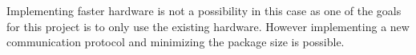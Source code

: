 Implementing faster hardware is not a possibility in this case as one of the goals for this project is to only use the existing hardware.
However implementing a new communication protocol and minimizing the package size is possible.\\
